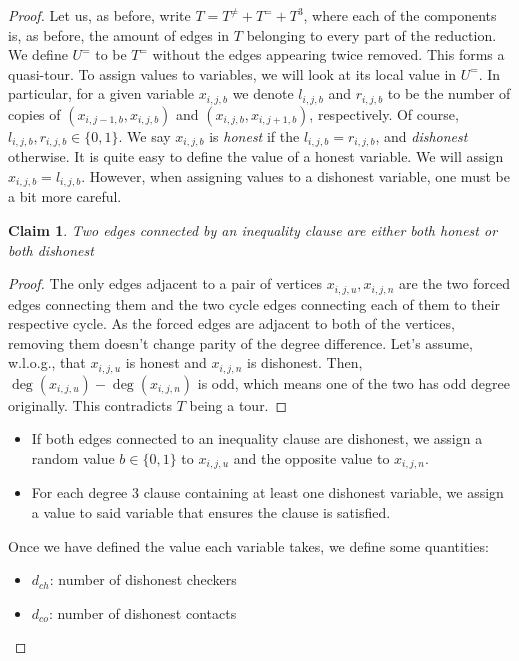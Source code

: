 \documentclass[12pt]{article}
\newtheorem{claim}{Claim}
\begin{document}
\begin{proof}
    Let us, as before, write $T= T^{\not =} +T^=+T^3$, where each of the components is, as before, the amount of edges in $T$ belonging to every part of the reduction. 
    We define $U^=$ to be $T^=$ without the edges appearing twice removed. This forms a quasi-tour. 
    To assign values to variables, we will look at its local value in $U^=$.
    In particular, for a given variable $x_{i,j,b}$ we denote $l_{i,j,b}$ and $r_{i,j,b}$ to be the number of copies of $(x_{i,j-1,b}, x_{i,j,b})$ and $(x_{i,j,b}, x_{i,j+1,b})$, respectively. Of course, $l_{i,j,b}, r_{i,j,b} \in \{0,1\}$.
    We say $x_{i,j,b}$ is \textit{honest} if the $l_{i,j,b}=r_{i,j,b}$, and \textit{dishonest} otherwise. 
    It is quite easy to define the value of a honest variable. We will assign $x_{i,j,b}=l_{i,j,b}$. 
    However, when assigning values to a dishonest variable, one must be a bit more careful. 
    \begin{claim}\label{parity}
    Two edges connected by an inequality clause are either both honest or both dishonest
    \end{claim}
    \begin{proof}
        The only edges adjacent to a pair of vertices $x_{i,j,u}, x_{i,j,n}$ are the two forced edges connecting them and the two cycle edges connecting each of them to their respective cycle. 
        As the forced edges are adjacent to both of the vertices, removing them doesn't change parity of the degree difference.
        Let's assume, w.l.o.g., that $x_{i,j,u}$ is honest and $x_{i,j,n}$ is dishonest. Then,  $\deg(x_{i,j,u})-\deg(x_{i,j,n})$  is odd, which means one of the two has odd degree originally. This contradicts $T$ being a tour. 
    \end{proof}
    \begin{itemize}
    \item If both edges connected to an inequality clause are dishonest, we assign a random value $b\in\{0,1\}$ to $x_{i,j,u}$ and the opposite value to $x_{i,j,n}$. 
    \item For each degree 3 clause containing at least one dishonest variable, we assign a value to said variable that ensures the clause is satisfied. 
    \end{itemize}
    Once we have defined the value each variable takes, we define some quantities:
    \begin{itemize}
        \item $d_{ch}$: number of dishonest checkers
        \item $d_{co}$: number of dishonest contacts

\end{itemize}
\end{proof}
\end{document}
